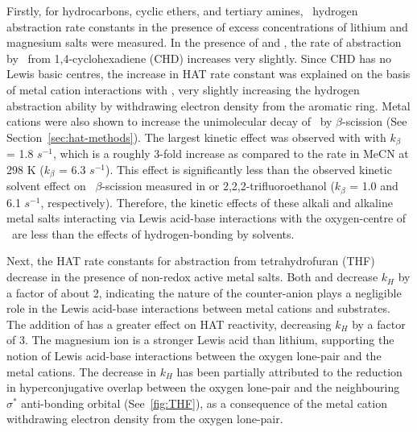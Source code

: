 Firstly, for hydrocarbons, cyclic ethers, and tertiary amines, \cumo\ hydrogen
abstraction rate constants in the presence of excess concentrations of lithium
and magnesium salts were measured.\cite{Salamone2013a} In the presence of
 and , the rate of abstraction by \cumo\ from
1,4-cyclohexadiene (CHD) increases very slightly. Since CHD has no Lewis basic
centres, the increase in HAT rate constant was explained on the basis of metal
cation interactions with \cumo, very slightly increasing the hydrogen
abstraction ability by withdrawing electron density from the aromatic ring.
Metal cations were also shown to increase the unimolecular decay of \cumo\ by
$\beta$-scission (See Section~\ref{sec:hat-methods}). The largest kinetic effect
was observed with  with $k_\beta$ = 1.8 $s^{-1}$, which is a
roughly 3-fold increase as compared to the rate in MeCN at 298 K
($k_\beta$ = 6.3 $s^{-1}$).\cite{Avila1995} This effect is significantly
less than the observed kinetic solvent effect on \cumo\ $\beta$-scission
measured in  or 2,2,2-trifluoroethanol ($k_\beta$ = 1.0 and
6.1 $s^{-1}$, respectively).\cite{Bietti2005, Neta1984} Therefore, the
kinetic effects of these alkali and alkaline metal salts interacting via Lewis
acid-base interactions with the oxygen-centre of \cumo\ are less than the
effects of hydrogen-bonding by solvents.

Next, the HAT rate constants for abstraction from tetrahydrofuran (THF) decrease
in the presence of non-redox active metal salts. Both  and 
decrease $k_H$ by a factor of about 2, indicating the nature of the
counter-anion plays a negligible role in the Lewis acid-base interactions
between metal cations and substrates. The addition of  has a
greater effect on HAT reactivity, decreasing $k_H$ by a factor of 3. The
magnesium ion is a stronger Lewis acid than lithium,\cite{Fukuzumi2002}
supporting the notion of Lewis acid-base interactions between the oxygen
lone-pair and the metal cations. The decrease in $k_H$ has been partially
attributed to the reduction in hyperconjugative overlap between the oxygen
lone-pair and the neighbouring  $\sigma^*$ anti-bonding orbital
(See~\ref{fig:THF}), as a consequence of the metal cation withdrawing electron
density from the oxygen lone-pair.

